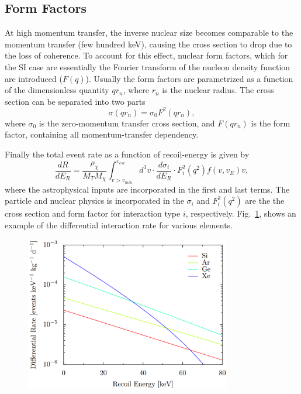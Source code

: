 \subsection{Form Factors}

At high momentum transfer, the inverse nuclear size becomes comparable to the momentum transfer (few hundred keV), causing the cross section to drop due to the loss of coherence. To account for this effect, nuclear form factors, which for the SI case are essentially the Fourier transform of the nucleon density function are introduced ($F(q)$). Usually the form factors are parametrized as a function of  the dimensionless quantity $qr_n$, where $r_n$ is the nuclear radius. The cross section can be separated into two parts
\begin{equation}
\sigma(qr_n) = \sigma_0F^2(qr_n),
\end{equation}
where $\sigma_0$ is the zero-momentum transfer cross section, and $F(qr_n)$ is the form factor, containing all momentum-transfer dependency.

Finally the total event rate as a function of recoil-energy is given by
\begin{equation}
\frac{dR}{dE_R} = \frac{\rho_\chi}{M_TM_\chi}\int_{v>v_{min}}^{v_{esc}}d^3v\cdot \frac{d\sigma_i}{dE_R}\cdot F_i^2(q^2)f(v,v_E)v,
\end{equation} 
where the astrophysical inputs are incorporated in the first and last terms. The particle and nuclear physics is incorporated in the $\sigma_i$ and $F^2_i(q^2)$ are the the cross section and form factor for interaction type $i$, respectively. Fig.~\ref{fig:interactionRate}, shows an example of the differential interaction rate for various elements.

\begin{figure}[t!]
	\centering
	\includegraphics[width=0.8\textwidth]{figs/EventRate.png}
	\label{fig:interactionRate}
\end{figure}

